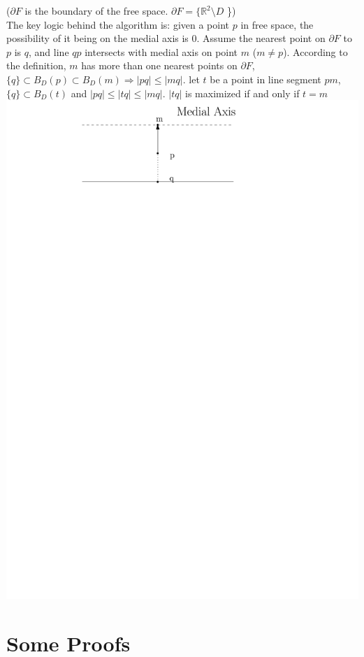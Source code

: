 \documentclass[12pt]{article}
\begin{document}
  ($\partial F$ is the boundary of the free space. $\partial F = \{ \mathbb{R}^2 \setminus D$ \})\\

  The key logic behind the algorithm is: given a point $p$ in free space, the possibility of it being on the medial axis is 0. Assume the nearest point on $\partial F$ to $p$ is $q$, and line $qp$ intersects with medial axis on point $m$ ($m \neq p$).  According to the definition, $m$ has more than one nearest points on $\partial F$, $\{ q \} \subset B_D(p) \subset B_D(m) \Longrightarrow |pq| \leq |mq|$. let $t$ be a point in line segment $pm$, $\{ q \} \subset B_D(t)$ and $|pq| \leq |tq| \leq |mq|$. $|tq|$ is maximized if and only if $t = m$\\    
   
  \includegraphics[scale=1]{LineSearch.pdf}
   
  \section{Some Proofs}
  
\end{document}
